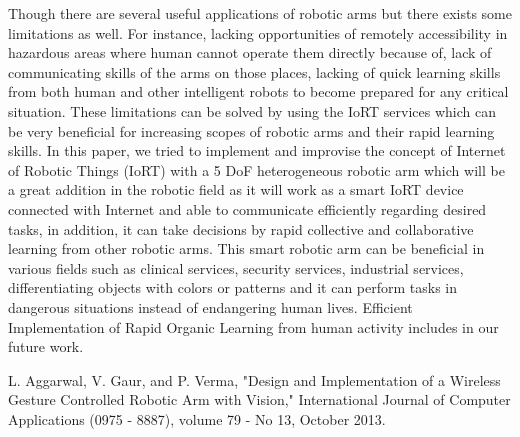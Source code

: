 \documentclass[conference]{IEEEtran}
\begin{document}
Though there are several useful applications of robotic arms but there exists some limitations as well. For instance, lacking opportunities of remotely accessibility in hazardous areas where human cannot operate them directly because of, lack of communicating skills of the arms on those places, lacking of quick learning skills from both human and other intelligent robots to become prepared for any critical situation. These limitations can be solved by using the IoRT services which can be very beneficial for increasing scopes of robotic arms and their rapid learning skills.
In this paper, we tried to implement and improvise the concept of Internet of Robotic Things (IoRT) with a 5 DoF heterogeneous robotic arm which will be a great addition in the robotic field as it will work as a smart IoRT device connected with Internet and able to communicate efficiently regarding desired tasks, in addition, it can take decisions by rapid collective and collaborative learning from other robotic arms. This smart robotic arm can be beneficial in various fields such as clinical services, security services, industrial services, differentiating objects with colors or patterns and it can perform tasks in dangerous situations instead of endangering human lives. Efficient Implementation of Rapid Organic Learning from human activity includes in our future work.

\begin{thebibliography}{1}

L. Aggarwal, V. Gaur, and P. Verma, "Design and Implementation of a Wireless Gesture Controlled Robotic Arm with Vision," International Journal of Computer Applications (0975 - 8887), volume 79 - No 13, October 2013.



\end{thebibliography}




\end{document}
